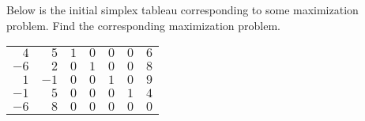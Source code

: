 \documentclass[12pt,letterpaper]{exam}
\begin{document}
\begin{questions}
\newpage
\question[10] Below is the initial simplex tableau corresponding to some maximization problem. Find the corresponding maximization problem. \par
	\begin{table}[!ht]
	\centering
	\begin{tabular}{rrrrrrr}
	$4$ & $5$ & $1$ & $0$ & $0$ & $0$ & $6$ \\
	$-6$ & $2$ & $0$ & $1$ & $0$ & $0$ & $8$ \\
	$1$ & $-1$ & $0$ & $0$ & $1$ & $0$ & $9$ \\
	$-1$ & $5$ & $0$ & $0$ & $0$ & $1$ & $4$ \\
	$-6$ & $8$ & $0$ & $0$ & $0$ & $0$ & $0$
	\end{tabular}
	\end{table} \par


\end{questions}
\end{document}

